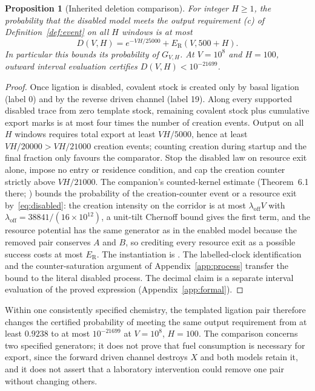 \documentclass[11pt,a4paper]{article}
\theoremstyle{plain}
\newtheorem{proposition}[theorem]{Proposition}
\theoremstyle{definition}
\theoremstyle{remark}
\newcommand{\Good}{G_{V,H}}
\newcommand{\ER}{E_{\mathrm R}}
\begin{document}
\begin{proposition}[Inherited deletion comparison]\label{prop:disabled}
For integer $H\ge1$, the probability that the disabled model meets the output requirement (c) of Definition~\ref{def:event} on all $H$ windows is at most
\begin{equation}\label{eq:disabled}
 D(V,H)=e^{-VH/25000}+\ER(V,500+H).
\end{equation}
In particular this bounds its probability of $\Good$. At $V=10^8$ and $H=100$, outward interval evaluation certifies $D(V,H)<10^{-21699}$.
\end{proposition}
\begin{proof}
Once ligation is disabled, covalent stock is created only by basal ligation (label 0) and by the reverse driven channel (label 19). Along every supported disabled trace from zero template stock, remaining covalent stock plus cumulative export marks is at most four times the number of creation events. Output on all $H$ windows requires total export at least $VH/5000$, hence at least $VH/20000>VH/21000$ creation events; counting creation during startup and the final fraction only favours the comparator. Stop the disabled law on resource exit alone, impose no entry or residence condition, and cap the creation counter strictly above $VH/21000$. The companion's counted-kernel estimate (Theorem~6.1 there; ) bounds the probability of the creation-counter event or a resource exit by~\eqref{eq:disabled}: the creation intensity on the corridor is at most $\lambda_{\mathrm{off}}V$ with $\lambda_{\mathrm{off}}=38841/(16\times10^{12})$, a unit-tilt Chernoff bound gives the first term, and the resource potential has the same generator as in the enabled model because the removed pair conserves $A$ and $B$, so crediting every resource exit as a possible success costs at most $\ER$. The instantiation is . The labelled-clock identification and the counter-saturation argument of Appendix~\ref{app:process} transfer the bound to the literal disabled process. The decimal claim is a separate interval evaluation of the proved expression (Appendix~\ref{app:formal}).
\end{proof}

Within one consistently specified chemistry, the templated ligation pair therefore changes the certified probability of meeting the same output requirement from at least $0.9238$ to at most $10^{-21699}$ at $V=10^8$, $H=100$. The comparison concerns two specified generators; it does not prove that fuel consumption is necessary for export, since the forward driven channel destroys $X$ and both models retain it, and it does not assert that a laboratory intervention could remove one pair without changing others.
\end{document}

